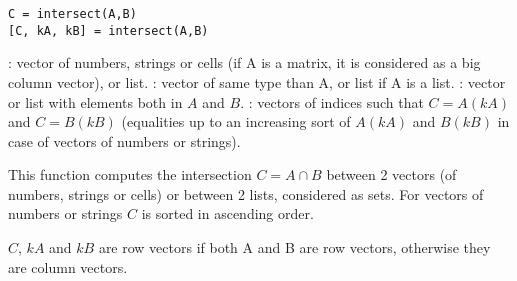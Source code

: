 
\begin{mandesc}
\end{mandesc}

\begin{calling_sequence}
\begin{verbatim}
C = intersect(A,B)
[C, kA, kB] = intersect(A,B)
\end{verbatim}
\end{calling_sequence}
\begin{parameters}
  \begin{varlist}
    : vector of numbers, strings or cells (if A is a matrix, it is
    considered as a big column vector), or list.
    : vector of same type than A, or list if A is a list. 
    : vector or list with elements both in  $A$ and $B$.
    : vectors of indices such that $C = A(kA)$ and $C =
    B(kB)$ (equalities up to an increasing sort of $A(kA)$ and $B(kB)$
    in case of vectors of numbers or strings). 
  \end{varlist}
\end{parameters}

\begin{mandescription}
  This function computes the intersection $C = A \cap B$
  between 2 vectors (of numbers, strings or cells) or between 2
  lists, considered as sets. For vectors of numbers or strings
  $C$ is sorted in ascending order.

  $C$, $kA$ and $kB$ are row vectors if both A and B are row vectors, otherwise they
  are column vectors.
  
\end{mandescription}


